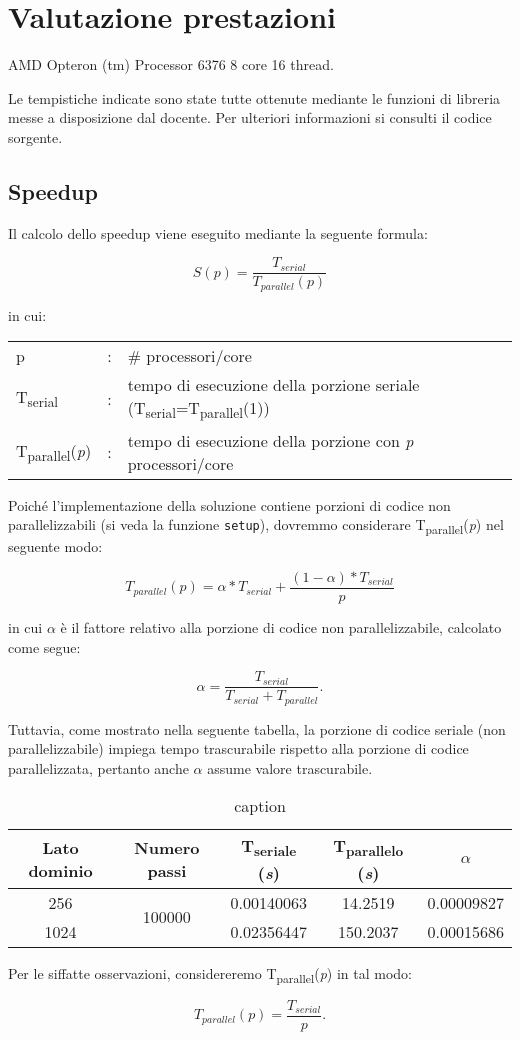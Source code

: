\section{Valutazione prestazioni}
AMD Opteron (tm) Processor 6376 8 core 16 thread.


Le tempistiche indicate sono state tutte ottenute mediante le funzioni di
libreria messe a disposizione dal docente. Per ulteriori informazioni si
consulti il codice sorgente.

\subsection{Speedup}

Il calcolo dello speedup viene eseguito mediante la seguente formula:

\[ 
    S(p) = \frac{T_{serial}}{T_{parallel}(p)}
\]

in cui:

\begin{center}
\begin{tabular}{lll}
    p & : & \# processori/core\\
    T\textsubscript{serial}& : & tempo di esecuzione della porzione seriale
    (T\textsubscript{serial}=T\textsubscript{parallel}(1))\\
    T\textsubscript{parallel}(\textit{p}) & : & tempo di esecuzione della porzione con
    \textit{p} processori/core
\end{tabular}
\end{center}

Poiché l'implementazione della soluzione contiene porzioni di codice non
parallelizzabili (si veda la funzione \texttt{setup}), dovremmo considerare
T\textsubscript{parallel}(\textit{p}) nel seguente modo:

\[ 
T_{parallel}(p) = \alpha * T_{serial} +  \frac{(1 - \alpha) *
T_{serial}}{p}
\]

in cui $\alpha$ è il fattore relativo alla porzione di codice non
parallelizzabile, calcolato come segue:

\[ 
\alpha = \frac{T_{serial}}{T_{serial} + T_{parallel}}.
\]

Tuttavia, come mostrato nella seguente tabella, la porzione di codice seriale
(non parallelizzabile) impiega tempo trascurabile rispetto alla porzione di
codice parallelizzata, pertanto anche $\alpha$ assume valore trascurabile.

\begin{table}[ht]
\begin{tabular}{ccccc}
\toprule
 Lato dominio & Numero passi & T\textsubscript{seriale} (\textit{s}) &
 T\textsubscript{parallelo} (\textit{s})& $\alpha$ \\
 \midrule
    256 & \multirow{2}{*}{100000} & 0.00140063 & 14.2519 & 0.00009827 \\
    1024 & & 0.02356447 & 150.2037 & 0.00015686 \\
\bottomrule
\end{tabular}
\caption{caption}
\end{table}

Per le siffatte osservazioni, considereremo
T\textsubscript{parallel}(\textit{p}) in tal modo:

\[ 
T_{parallel}(p) = \frac{T_{serial}}{p}.
\]
